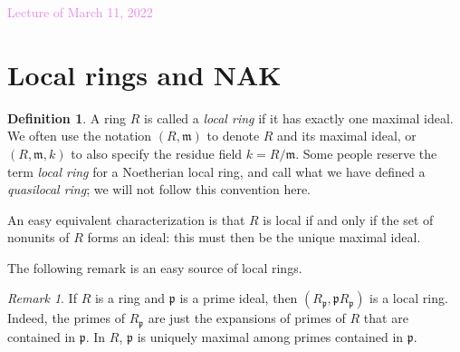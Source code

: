 \documentclass{amsart}[12pt]
\newcommand{\Mar}[1]{\textcolor{violet}{Lecture of March #1, 2022}}
\newcommand{\p}{{\mathfrak p}}
\newcommand{\m}{{\mathfrak m}}
\numberwithin{equation}{section}
\theoremstyle{plain} %
\theoremstyle{definition}
\newtheorem{definition}[equation]{Definition}
\theoremstyle{remark}
\newtheorem{remark}[equation]{Remark}
\renewcommand{\sec}[1]{\section{#1}}
\begin{document}
\Mar{11}

\sec{Local rings and NAK}


\begin{definition}
	A ring $R$ is called a \emph{local ring} if it has exactly one maximal ideal. We often use the notation $(R,\m)$\index{$(R,\m)$} to denote $R$ and its maximal ideal, or $(R,\m,k)$\index{$(R,\m,k)$} to also specify the residue field $k=R/\m$. Some people reserve the term \emph{local ring} for a Noetherian local ring, and call what we have defined a \emph{quasilocal ring}; we will not follow this convention here.\end{definition}

An easy equivalent characterization is that $R$ is local if and only if the set of nonunits of $R$ forms an ideal: this must then be the unique maximal ideal.

The following remark is an easy source of local rings.
\begin{remark}
	If $R$ is a ring and $\p$ is a prime ideal, then $(R_\p,\p R_\p)$ is a local ring. Indeed, the primes of $R_\p$ are just the expansions of primes of $R$ that are contained in $\p$. In $R$, $\p$ is uniquely maximal among primes contained in $\p$.
\end{remark}
\end{document}
